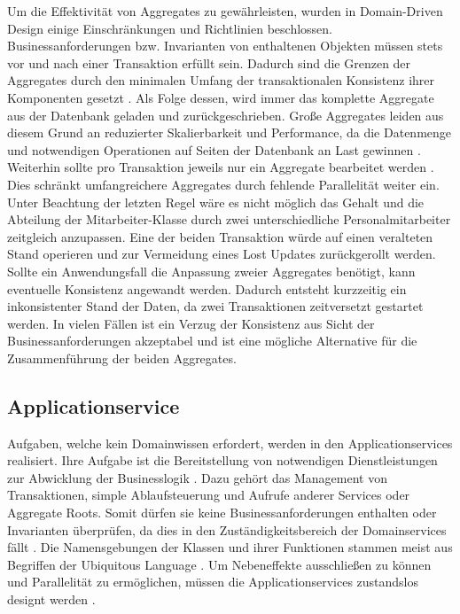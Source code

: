 Um die Effektivität von Aggregates zu gewährleisten, wurden in Domain-Driven Design einige Einschränkungen und Richtlinien beschlossen. Businessanforderungen bzw. Invarianten von enthaltenen Objekten müssen stets vor und nach einer Transaktion erfüllt sein. Dadurch sind die Grenzen der Aggregates durch den minimalen Umfang der transaktionalen Konsistenz ihrer Komponenten gesetzt \cite[S. 354]{Vernon.2015}. Als Folge dessen, wird immer das komplette Aggregate aus der Datenbank geladen und zurückgeschrieben. Große Aggregates leiden aus diesem Grund an reduzierter Skalierbarkeit und Performance, da die Datenmenge und notwendigen Operationen auf Seiten der Datenbank an Last gewinnen \cite[S. 355]{Vernon.2015}. Weiterhin sollte pro Transaktion jeweils nur ein Aggregate bearbeitet werden \cite[S. 354]{Vernon.2015}. Dies schränkt umfangreichere Aggregates durch fehlende Parallelität weiter ein. Unter Beachtung der letzten Regel wäre es nicht möglich das Gehalt und die Abteilung der Mitarbeiter-Klasse durch zwei unterschiedliche Personalmitarbeiter zeitgleich anzupassen. Eine der beiden Transaktion würde auf einen veralteten Stand operieren und zur Vermeidung eines \Gls{Lost Update}s zurückgerollt werden. Sollte ein Anwendungsfall die Anpassung zweier Aggregates benötigt, kann eventuelle Konsistenz angewandt werden. Dadurch entsteht kurzzeitig ein inkonsistenter Stand der Daten, da zwei Transaktionen zeitversetzt gestartet werden. In vielen Fällen ist ein Verzug der Konsistenz aus Sicht der Businessanforderungen akzeptabel und ist eine mögliche Alternative für die Zusammenführung der beiden Aggregates. \cite[S. 364]{Vernon.2015}

\subsection{Applicationservice}

Aufgaben, welche kein Domainwissen erfordert, werden in den Applicationservices realisiert. Ihre Aufgabe ist die Bereitstellung von notwendigen Dienstleistungen zur Abwicklung der Businesslogik \cite{Gorodinski.2012}. Dazu gehört das Management von Transaktionen, simple Ablaufsteuerung und Aufrufe anderer Services oder Aggregate Roots. Somit dürfen sie keine Businessanforderungen enthalten oder Invarianten überprüfen, da dies in den Zuständigkeitsbereich der Domainservices fällt \cite[S. 267]{Vernon.2015}. Die Namensgebungen der Klassen und ihrer Funktionen stammen meist aus Begriffen der Ubiquitous Language \cite[S. 105]{Evans.2011}. Um Nebeneffekte ausschließen zu können und Parallelität zu ermöglichen, müssen die Applicationservices zustandslos designt werden \cite[S. 105]{Evans.2011}. 

